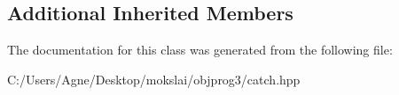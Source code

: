 \subsection*{Additional Inherited Members}


The documentation for this class was generated from the following file\+:\begin{DoxyCompactItemize}
\item 
C\+:/\+Users/\+Agne/\+Desktop/mokslai/objprog3/catch.\+hpp\end{DoxyCompactItemize}
